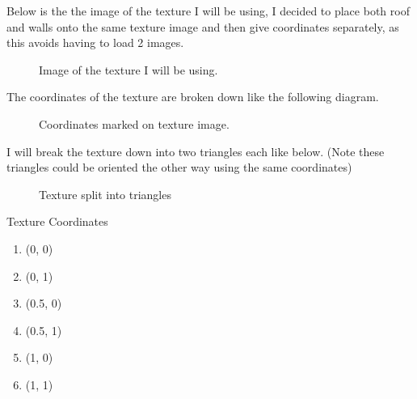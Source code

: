 \documentclass[10pt]{report}
\begin{document}
Below is the the image of the texture I will be using, I decided to place both roof and walls onto the same texture image and then give coordinates separately, as this avoids having to load 2 images.

\begin{figure}[H]
    \centering
    \caption{Image of the texture I will be using.}
\end{figure}

The coordinates of the texture are broken down like the following diagram.
\begin{figure}[H]
    \centering
    \caption{Coordinates marked on texture image.}
\end{figure}

I will break the texture down into two triangles each like below. (Note these triangles could be oriented the other way using the same coordinates)
\begin{figure}[H]
    \centering
    \caption{Texture split into triangles}
\end{figure}


Texture Coordinates
\begin{enumerate}[(1)]
    \item (0, 0)
    \item (0, 1)
    \item (0.5, 0)
    \item (0.5, 1)
    \item (1, 0)
    \item (1, 1)
\end{enumerate}
\end{document}
